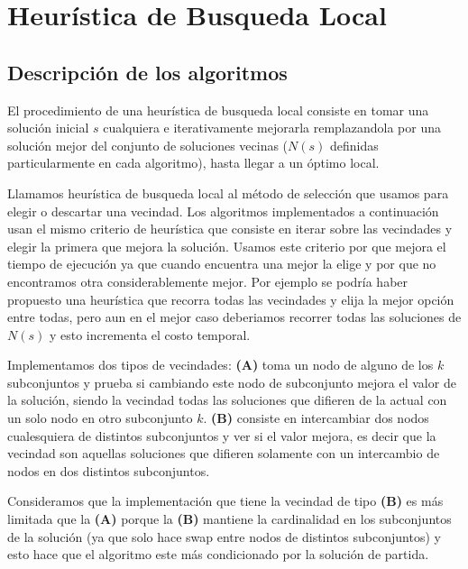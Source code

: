 \section{Heurística de Busqueda Local}
\subsection{Descripción de los algoritmos}
El procedimiento de una heurística de busqueda local consiste en tomar una solución inicial $s$ cualquiera e iterativamente mejorarla remplazandola por una solución mejor del conjunto de soluciones vecinas ($N(s)$ definidas particularmente en cada algoritmo), hasta llegar a un óptimo local.

Llamamos heurística de busqueda local al método de selección que usamos para elegir o descartar una vecindad. Los algoritmos implementados a continuación usan el mismo criterio de heurística que consiste en iterar sobre las vecindades y elegir la primera que mejora la solución. Usamos este criterio por que mejora el tiempo de ejecución ya que cuando encuentra una mejor la elige y por que no encontramos otra considerablemente mejor. Por ejemplo se podría haber propuesto una heurística que recorra todas las vecindades y elija la mejor opción entre todas, pero aun en el mejor caso deberiamos recorrer todas las soluciones de $N(s)$ y esto incrementa el costo temporal.

Implementamos dos tipos de vecindades: \textbf{(A)} toma un nodo de alguno de los $k$ subconjuntos y prueba si cambiando este nodo de subconjunto mejora el valor de la solución, siendo la vecindad todas las soluciones que difieren de la actual con un solo nodo en otro subconjunto $k$. \textbf{(B)} consiste en intercambiar dos nodos cualesquiera de distintos subconjuntos y ver si el valor mejora, es decir que la vecindad son aquellas soluciones que difieren solamente con un intercambio de nodos en dos distintos subconjuntos.

Consideramos que la implementación que tiene la vecindad de tipo \textbf{(B)} es más limitada que la \textbf{(A)} porque la \textbf{(B)} mantiene la cardinalidad en los subconjuntos de la solución (ya que solo hace swap entre nodos de distintos subconjuntos) y esto hace que el algoritmo este más condicionado por la solución de partida.

